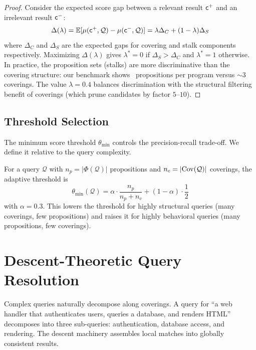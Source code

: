 \documentclass[11pt]{article}
\newcommand{\QuerySheaf}{\mathcal{Q}}
\newcommand{\MatchScore}{\mu}
\newcommand{\props}{\Phi}                           %
\begin{document}
\begin{proof}
Consider the expected score gap between a relevant result $\mathsf{c}^{+}$ and
an irrelevant result $\mathsf{c}^{-}$:
\[
  \Delta(\lambda) = \mathbb{E}[\MatchScore(\coord^{+}, \QuerySheaf) -
    \MatchScore(\coord^{-}, \QuerySheaf)]
  = \lambda \Delta_C + (1-\lambda) \Delta_S
\]
where $\Delta_C$ and $\Delta_S$ are the expected gaps for covering and
stalk components respectively.  Maximizing $\Delta(\lambda)$ gives
$\lambda^{*} = 0$ if $\Delta_S > \Delta_C$ and $\lambda^{*} = 1$
otherwise.  In practice, the proposition sets (stalks) are more
discriminative than the covering structure: our benchmark shows
\compPropsMean\ propositions per program versus $\sim$3 coverings.
The value $\lambda = 0.4$ balances discrimination with the structural
filtering benefit of coverings (which prune candidates by factor $5$--$10$).
\end{proof}

\subsection{Threshold Selection}

The minimum score threshold $\theta_{\min}$ controls the
precision-recall trade-off.  We define it relative to the query complexity.

\begin{definition}\label{def:adaptive-threshold}
For a query $\QuerySheaf$ with $n_p = |\props(\QuerySheaf)|$
propositions and $n_c = |\Cov(\QuerySheaf)|$ coverings, the adaptive
threshold is
\[
  \theta_{\min}(\QuerySheaf) = \alpha \cdot \frac{n_p}{n_p + n_c} +
  (1 - \alpha) \cdot \frac{1}{2}
\]
with $\alpha = 0.3$.  This lowers the threshold for highly structural
queries (many coverings, few propositions) and raises it for highly
behavioral queries (many propositions, few coverings).
\end{definition}

\section{Descent-Theoretic Query Resolution}\label{sec:descent}

Complex queries naturally decompose along coverings.  A query for ``a
web handler that authenticates users, queries a database, and renders
HTML'' decomposes into three sub-queries: authentication, database
access, and rendering.  The descent machinery assembles local matches
into globally consistent results.
\end{document}
